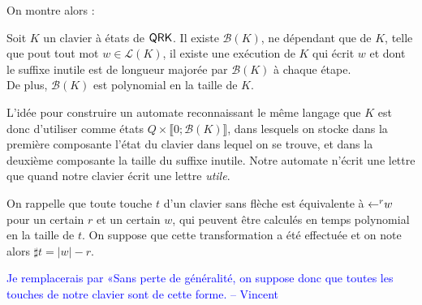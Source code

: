 \documentclass[12pt, a4paper]{article}
\renewcommand{\L}{\mathcal{L}}
\newcommand{\vincent}[1]{\textcolor{blue}{#1 -- Vincent}}
\begin{document}
    On montre alors :
    \begin{inutilesbornés}\label{bk}
        Soit $K$ un clavier à états de $\mathsf{QRK}$. Il existe $\mathcal{B}(K)$, ne dépendant que de $K$, telle que pout tout mot $w \in \L(K)$,
        il existe une exécution de $K$ qui écrit $w$ et dont le suffixe inutile est de longueur majorée par $\mathcal{B}(K)$ à chaque étape. \\
        De plus, $\mathcal{B}(K)$ est polynomial en la taille de $K$.
    \end{inutilesbornés}
    L'idée pour construire un automate reconnaissant le même langage que $K$ est donc d'utiliser comme états $Q \times \llbracket 0 ; \mathcal{B}(K) \rrbracket$, dans lesquels on stocke dans la première composante l'état du clavier dans lequel on se trouve,
    et dans la deuxième composante la taille du suffixe inutile. Notre automate n'écrit une lettre que quand notre clavier écrit une lettre \emph{utile}.
    
    On rappelle que toute touche $t$ d'un clavier sans flèche est équivalente à $\mathord{\leftarrow}^r w$ pour un certain $r$ et un certain $w$, qui peuvent être calculés en temps polynomial en la taille de $t$. On suppose que cette transformation a été effectuée et on note alors $\sharp t = |w| - r$.

    \vincent{Je remplacerais par «Sans perte de généralité, on suppose donc que toutes les touches de notre clavier sont de cette forme.}
\end{document}
